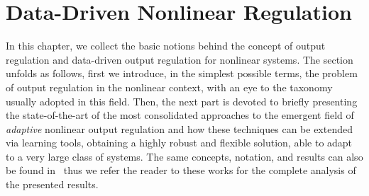 \chapter{Data-Driven Nonlinear Regulation}%
\label{CH:DATA-DRIVEN-REGULATION}
In this chapter, we collect the basic notions behind the concept of output regulation and data-driven output regulation for nonlinear systems.
The section unfolds as follows, first we introduce, in the simplest possible terms, the problem of output regulation in the
nonlinear context, with an eye to the taxonomy usually adopted in this field.
Then, the next part is devoted to briefly presenting the state-of-the-art of the most consolidated approaches to
the emergent field of \emph{adaptive} nonlinear output regulation and how these techniques can be extended via learning tools, obtaining
a highly robust and flexible solution, able to adapt to a very large class of systems.
The same concepts, notation, and results can also be found in~\cite*{bin2019class, bin2020model, bin2020approximate, gentilini2022adaptive, gentilini2022data}
thus we refer the reader to these works for the complete analysis of the presented results.


